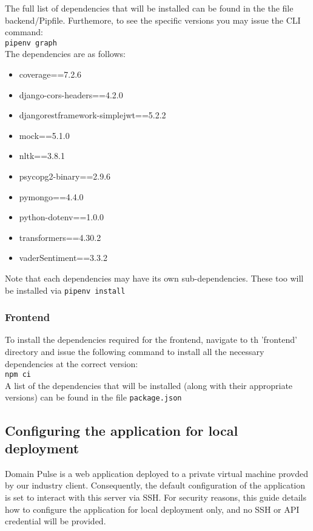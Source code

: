 \documentclass{article}
\newcommand{\code}[1]{\colorbox{light-gray}{\texttt{#1}}}
\begin{document}
The full list of dependencies that will be installed can be found in the the file backend/Pipfile. Furthemore, to see the specific versions you may issue the CLI command:\\
\code{pipenv graph} \\
The dependencies are as follows:
\begin{itemize}
    \item coverage==7.2.6
    \item django-cors-headers==4.2.0
    \item djangorestframework-simplejwt==5.2.2
    \item mock==5.1.0
    \item nltk==3.8.1
    \item psycopg2-binary==2.9.6
    \item pymongo==4.4.0
    \item python-dotenv==1.0.0
    \item transformers==4.30.2
    \item vaderSentiment==3.3.2
\end{itemize}
Note that each dependencies may have its own sub-dependencies. These too will be installed via \code{pipenv install}

\subsubsection{Frontend}
To install the dependencies required for the frontend, navigate to th 'frontend' directory and issue the following command to install
all the necessary dependencies at the correct version: \\
\code{npm ci}\\
A list of the dependencies that will be installed (along with their appropriate versions) can be found in the file \code{package.json}


\subsection{Configuring the application for local deployment}
Domain Pulse is a web application deployed to a private virtual machine provded by our industry client. Consequently, the default
configuration of the application is set to interact with this server via SSH. For security reasons, this guide details how to configure
the application for local deployment only, and no SSH or API credential will be provided.
\end{document}
